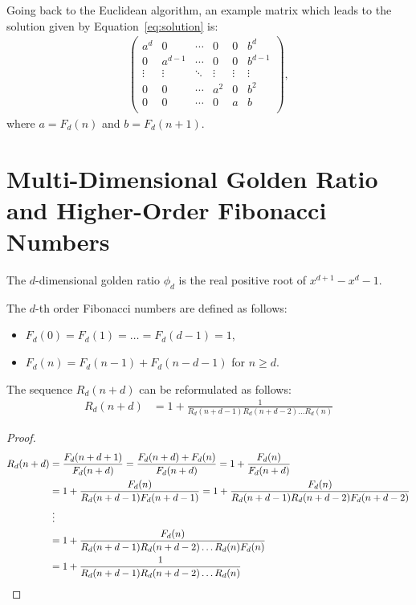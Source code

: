 \documentclass[english,version-2020-11]{uzl-thesis}
\begin{document}
Going back to the Euclidean algorithm,
an example matrix which leads to the solution given by Equation~\ref{eq:solution} is:
\begin{align*}
  \left(\begin{array}{ccccc|c}
    a^d    & 0       & \cdots & 0      & 0      & b^d     \\
    0      & a^{d-1} & \cdots & 0      & 0      & b^{d-1} \\
    \vdots & \vdots  & \ddots & \vdots & \vdots & \vdots  \\
    0      & 0       & \cdots & a^2    & 0      & b^2     \\
    0      & 0       & \cdots & 0      & a      & b       \\
  \end{array}\right),
\end{align*}
where $a = F_d(n)$ and $b = F_d(n + 1)$.

\section{Multi-Dimensional Golden Ratio and Higher-Order Fibonacci Numbers}

\begin{definition}
  The $d$-dimensional golden ratio $\phi_d$ is the real positive root of $x^{d+1} - x^d - 1$.
\end{definition}

\begin{definition}
  The $d$-th order Fibonacci numbers are defined as follows:
  \begin{itemize}
    \item $F_d(0) = F_d(1) = \dots = F_d(d-1) = 1$,
    \item $F_d(n) = F_d(n-1) + F_d(n-d-1)$ for $n \ge d$.
  \end{itemize}
\end{definition}

\begin{lemma}
  The sequence $R_d(n+d)$ can be reformulated as follows:
  \begin{align*}
    R_d(n+d)
    & = 1 + \frac{1}{R_d(n+d-1) R_d(n+d-2) \dots R_d(n)}
  \end{align*}
\end{lemma}

\begin{proof}
  \begin{align*}
    R_d(n+d)
    & = \frac{F_d(n+d+1)}{F_d(n+d)}
    = \frac{F_d(n+d) + F_d(n)}{F_d(n+d)}
    = 1 + \frac{F_d(n)}{F_d(n+d)} \\
    & = 1 + \frac{F_d(n)}{R_d(n+d-1) F_d(n+d-1)}
    = 1 + \frac{F_d(n)}{R_d(n+d-1) R_d(n+d-2) F_d(n+d-2)} \\
    & \mathrel{\vdots} \\
    & = 1 + \frac{F_d(n)}{R_d(n+d-1) R_d(n+d-2) \dots R_d(n) F_d(n)} \\
    & = 1 + \frac{1}{R_d(n+d-1) R_d(n+d-2) \dots R_d(n)}
    \qedhere
  \end{align*}
\end{proof}
\end{document}
